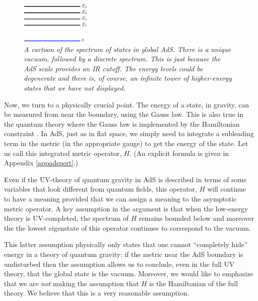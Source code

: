 \documentclass[12pt]{article}
\begin{document}
\begin{figure}[!ht]
\begin{center}
\includegraphics[width=0.3\textwidth]{enlevels_new.pdf}
\caption{\em A cartoon of the spectrum of states in global AdS. There is a unique vacuum, followed by a discrete spectrum.  This is just because the AdS scale provides an IR cutoff. The energy levels could be degenerate and there is, of course, an infinite tower of higher-energy states that we have not displayed.\label{figadsspect}} 
\end{center}
\end{figure}
 
Now, we turn to a physically crucial point. The energy of a state, in gravity, can be measured from near the boundary,  using the Gauss law. This is also true in the quantum theory \cite{Arnowitt:1962hi, Regge:1974zd} where the Gauss law is implemented by the Hamiltonian constraint \cite{DeWitt:1967yk}.  In AdS, just as in flat space,  we simply need to integrate a subleading term in the metric (in the appropriate gauge) to get the energy of the state. Let us call this integrated metric operator, $H$. (An explicit formula is given in Appendix \ref{appadspert}.)

Even if the UV-theory of quantum gravity in AdS is described in terms of some variables that look different from quantum fields, this operator, $H$ will continue to have a meaning provided that we can assign a meaning to the asymptotic metric operator. A key assumption in the argument is that when the low-energy theory is UV-completed, the spectrum of $H$  remains bounded below and moreover the the lowest eigenstate of this operator continues to correspond to the vacuum. 

 This latter assumption physically only states that one cannot ``completely hide'' energy in a theory of quantum gravity: if the metric near the AdS boundary is undisturbed then the assumption allows us to conclude, even in the full UV theory, that the global state is the vacuum. Moreover, we would like to emphasize that we are {\em not} making the assumption that $H$ is the Hamiltonian of the full theory.  We believe that this is a very reasonable assumption. 
\end{document}
